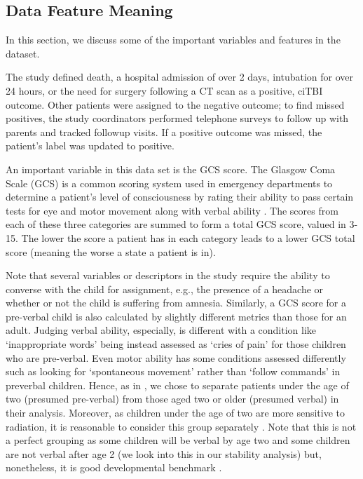 \documentclass[11pt, letterpaper]{amsart}
\let\Oldsubsection\subsection
\renewcommand{\subsection}{\FloatBarrier\Oldsubsection}
\begin{document}
\subsection{Data Feature Meaning}\label{ssec:datamean}


In this section, we discuss some of the important variables and features in the dataset. 

The study defined death, a hospital admission of over 2 days, intubation for over 24 hours, or the need for surgery following a CT scan as a positive, ciTBI outcome. Other patients were assigned to the negative outcome; to find missed positives, the study coordinators performed telephone surveys to follow up with parents and tracked followup visits. If a positive outcome was missed, the patient's label was updated to positive. 

An important variable in this data set is the GCS score. The Glasgow Coma Scale (GCS) is a common scoring system used in emergency departments to determine a patient's level of consciousness by rating their ability to pass certain tests for eye and motor movement along with verbal ability \cite{teasdale2014glasgow}. The scores from each of these three categories are summed to form a total GCS score, valued in 3-15. The lower the score a patient has in each category leads to a lower GCS total score (meaning the worse a state a patient is in). 

Note that several variables or descriptors in the study require the ability to converse with the child for assignment, e.g., the presence of a headache or whether or not the child is suffering from amnesia. Similarly, a GCS score for a pre-verbal child is also calculated by slightly different metrics than those for an adult. Judging verbal ability, especially, is different with a condition like `inappropriate words' being instead assessed as `cries of pain' for those children who are pre-verbal. Even motor ability has some conditions assessed differently such as looking for `spontaneous movement' rather than `follow commands' in preverbal children. Hence, as in \cite{kuppermann2009identification}, we chose to separate patients under the age of two (presumed pre-verbal) from those aged two or older (presumed verbal) in their analysis. Moreover, as children under the age of two are more sensitive to radiation, it is reasonable to consider this group separately \cite{brenner2002estimating}. Note that this is not a perfect grouping as some children will be verbal by age two and some children are not verbal after age 2 (we look into this in our stability analysis) but, nonetheless, it is good developmental benchmark \cite{blackwell2007pediatric}.
\end{document}
